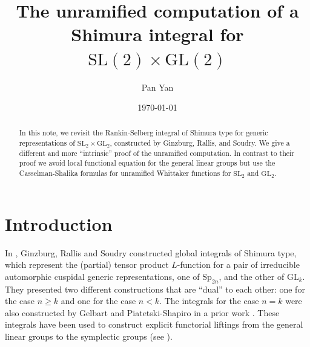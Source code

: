 \documentclass[11pt]{amsart}
\author[P. Yan]{Pan Yan}
\date{\today}
\title{The unramified computation of a Shimura integral for $\mathrm{SL}(2)\times \mathrm{GL}(2)$}
\theoremstyle{definition}
\theoremstyle{remark}
\begin{document}
\begin{abstract}
In this note, we revisit the Rankin-Selberg integral of Shimura type for generic representations of $\mathrm{SL}_2\times \mathrm{GL}_2$, constructed by Ginzburg, Rallis, and Soudry. We give a different and more ``intrinsic'' proof of the unramified computation. In contrast to their proof we avoid local functional equation for the general linear groups but use the Casselman-Shalika formulas for unramified Whittaker functions for $\mathrm{SL}_2$ and $\mathrm{GL}_2$. 
\end{abstract}






\maketitle




\section{Introduction}

In \cite{GinzburgRallisSoudry1998}, Ginzburg, Rallis and Soudry constructed global integrals of Shimura type, which represent the (partial) tensor product $L$-function for a pair of irreducible automorphic cuspidal generic representations, one of $\mathrm{Sp}_{2n}$, and the other of $\mathrm{GL}_k$. They presented two different constructions that are ``dual'' to each other: one for the case $n\ge k$ and one for the case $n<k$. 
The integrals for the case $n=k$ were also constructed by Gelbart and Piatetski-Shapiro in a prior work \cite{GelbartPiatetski-Shapiro1987}. These integrals have been used to construct explicit functorial liftings from the general linear groups to the symplectic groups (see \cite{GinzburgRallisSoudry1999, GinzburgRallisSoudry2011}).
\end{document}
